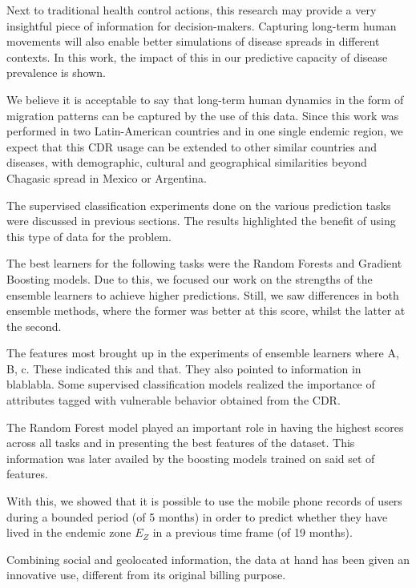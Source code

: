 Next to traditional health control actions, this research may provide a very insightful piece of information for decision-makers.
Capturing long-term human movements will also enable better simulations of disease spreads in different contexts.
In this work, the impact of this in our predictive capacity of disease prevalence is shown.

We believe it is acceptable to say that long-term human dynamics in the form of migration patterns can be captured by the use of this data.
Since this work was performed in two Latin-American countries and in one single endemic region, we expect that this CDR usage can be extended to other similar countries and diseases, with demographic, cultural and geographical similarities beyond Chagasic spread in Mexico or Argentina.



The supervised classification experiments done on the various prediction tasks were discussed in previous sections.
The results highlighted the benefit of using this type of data for the problem.


The best learners for the following tasks were the Random Forests and Gradient Boosting models.
Due to this, we focused our work on the strengths of the ensemble learners to achieve higher predictions.
Still, we saw differences in both ensemble methods, where the former was better at this score, whilst the latter at the second.


The features most brought up in the experiments of ensemble learners where A, B, c.
These indicated this and that.
They also pointed to information in  blablabla.
Some supervised classification models realized the importance of attributes tagged with vulnerable behavior obtained from the CDR.\@

The Random Forest model played an important role in having the highest scores across all tasks and in presenting the best features of the dataset.
This information was later availed by the boosting models trained on said set of features.



With this, we showed that it is possible to use the mobile phone records of users during a bounded period (of 5 months) in order to predict whether they have lived in the endemic zone $E_Z$ in a previous time frame (of 19 months).

Combining social and geolocated information, the data at hand has been given an innovative use, different from its original billing purpose.

